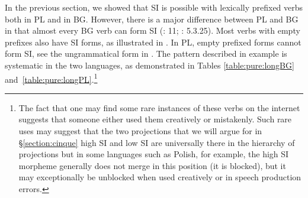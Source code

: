 \documentclass[output=paper,colorlinks,citecolor=brown]{langscibook}
\begin{document}
In the previous section, we showed that SI is possible with lexically prefixed verbs both in PL and in BG. 
However, there is a major difference between PL and BG in that almost every BG verb can form SI (\citealt{dickey-book}: 11; \citealt{nicolova2017}: 5.3.25). Most verbs with empty prefixes also have SI forms, as illustrated in . In PL, empty prefixed forms cannot form SI, see the ungrammatical form in . 
 The pattern described in example  is systematic in the two languages, as demonstrated in  Tables \ref{table:pure:longBG} and~\ref{table:pure:longPL}.\footnote{The fact that one may find some rare instances of these verbs on the internet suggests that someone either used them creatively or mistakenly. Such rare uses may suggest that the two projections that we will argue for in \S\ref{section:cinque} high SI and low SI are universally there in the hierarchy of projections but in some languages such as Polish, for example, the high SI morpheme generally does not merge in this position (it is blocked), but it may exceptionally be unblocked when used creatively or in speech production errors.}






\end{document}
